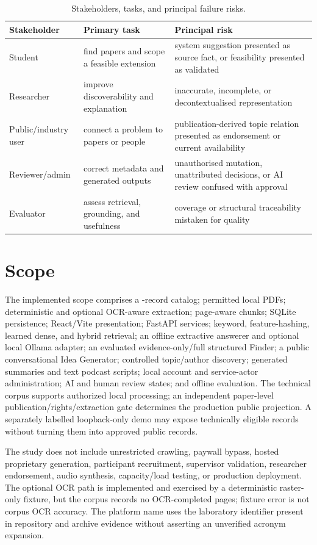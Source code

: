 \begin{table}[htbp]
\centering
\small
\caption{Stakeholders, tasks, and principal failure risks.}
\label{tab:stakeholders}
\begin{tabularx}{\textwidth}{P{27mm}YY}
\toprule
Stakeholder & Primary task & Principal risk \\
\midrule
Student & find papers and scope a feasible extension & system suggestion presented as source fact, or feasibility presented as validated \\
Researcher & improve discoverability and explanation & inaccurate, incomplete, or decontextualised representation \\
Public/industry user & connect a problem to papers or people & publication-derived topic relation presented as endorsement or current availability \\
Reviewer/admin & correct metadata and generated outputs & unauthorised mutation, unattributed decisions, or AI review confused with approval \\
Evaluator & assess retrieval, grounding, and usefulness & coverage or structural traceability mistaken for quality \\
\bottomrule
\end{tabularx}
\end{table}

\section{Scope}

The implemented scope comprises a \CatalogPaperCount{}-record catalog; permitted local PDFs; deterministic and optional OCR-aware extraction; page-aware chunks; SQLite persistence; React/Vite presentation; FastAPI services; keyword, feature-hashing, learned dense, and hybrid retrieval; an offline extractive answerer and optional local Ollama adapter; an evaluated evidence-only/full structured Finder; a public conversational Idea Generator; controlled topic/author discovery; generated summaries and text podcast scripts; local account and service-actor administration; AI and human review states; and offline evaluation. The technical corpus supports authorized local processing; an independent paper-level publication/rights/extraction gate determines the production public projection. A separately labelled loopback-only demo may expose technically eligible records without turning them into approved public records.

The study does not include unrestricted crawling, paywall bypass, hosted proprietary generation, participant recruitment, supervisor validation, researcher endorsement, audio synthesis, capacity/load testing, or production deployment. The optional OCR path is implemented and exercised by a deterministic raster-only fixture, but the corpus records no OCR-completed pages; fixture error is not corpus OCR accuracy. The platform name uses the laboratory identifier present in repository and archive evidence without asserting an unverified acronym expansion.

